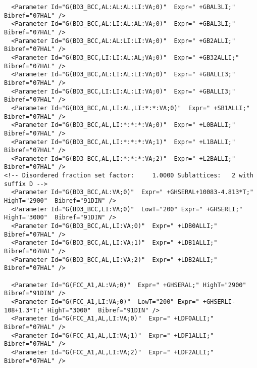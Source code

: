 \documentclass{article}
\begin{document}
\begin{appendices}
\begin{verbatim}
  <Parameter Id="G(BD3_BCC,AL:AL:AL:LI:VA;0)"  Expr=" +GBAL3LI;"  Bibref="07HAL" />
  <Parameter Id="G(BD3_BCC,AL:LI:AL:AL:VA;0)"  Expr=" +GBAL3LI;"  Bibref="07HAL" />
  <Parameter Id="G(BD3_BCC,AL:AL:LI:LI:VA;0)"  Expr=" +GB2ALLI;"  Bibref="07HAL" />
  <Parameter Id="G(BD3_BCC,LI:LI:AL:AL;VA;0)"  Expr=" +GB32ALLI;"  Bibref="07HAL" />
  <Parameter Id="G(BD3_BCC,AL:LI:AL:LI:VA;0)"  Expr=" +GBALLI3;"  Bibref="07HAL" />
  <Parameter Id="G(BD3_BCC,LI:LI:AL:LI:VA;0)"  Expr=" +GBALLI3;"  Bibref="07HAL" />
  <Parameter Id="G(BD3_BCC,AL,LI:AL,LI:*:*:VA;0)"  Expr=" +SB1ALLI;"  Bibref="07HAL" />
  <Parameter Id="G(BD3_BCC,AL,LI:*:*:*:VA;0)"  Expr=" +L0BALLI;"  Bibref="07HAL" />
  <Parameter Id="G(BD3_BCC,AL,LI:*:*:*:VA;1)"  Expr=" +L1BALLI;"  Bibref="07HAL" />
  <Parameter Id="G(BD3_BCC,AL,LI:*:*:*:VA;2)"  Expr=" +L2BALLI;"  Bibref="07HAL" />
<!-- Disordered fraction set factor:     1.0000 Sublattices:   2 with suffix D -->
  <Parameter Id="G(BD3_BCC,AL:VA;0)"  Expr=" +GHSERAL+10083-4.813*T;" HighT="2900"  Bibref="91DIN" />
  <Parameter Id="G(BD3_BCC,LI:VA;0)"  LowT="200" Expr=" +GHSERLI;" HighT="3000"  Bibref="91DIN" />
  <Parameter Id="G(BD3_BCC,AL,LI:VA;0)"  Expr=" +LDB0ALLI;"  Bibref="07HAL" />
  <Parameter Id="G(BD3_BCC,AL,LI:VA;1)"  Expr=" +LDB1ALLI;"  Bibref="07HAL" />
  <Parameter Id="G(BD3_BCC,AL,LI:VA;2)"  Expr=" +LDB2ALLI;"  Bibref="07HAL" />

  <Parameter Id="G(FCC_A1,AL:VA;0)"  Expr=" +GHSERAL;" HighT="2900"  Bibref="91DIN" />
  <Parameter Id="G(FCC_A1,LI:VA;0)"  LowT="200" Expr=" +GHSERLI-108+1.3*T;" HighT="3000"  Bibref="91DIN" />
  <Parameter Id="G(FCC_A1,AL,LI:VA;0)"  Expr=" +LDF0ALLI;"  Bibref="07HAL" />
  <Parameter Id="G(FCC_A1,AL,LI:VA;1)"  Expr=" +LDF1ALLI;"  Bibref="07HAL" />
  <Parameter Id="G(FCC_A1,AL,LI:VA;2)"  Expr=" +LDF2ALLI;"  Bibref="07HAL" />


\end{verbatim}
\end{appendices}
\end{document}
